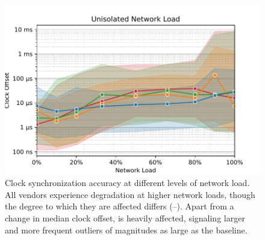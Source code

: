 \begin{figure}
    \centering
    \includegraphics[width=\linewidth]{res/generated/net_unprioritized_trend_rpi-4.pdf}
    \legend
    \caption{Clock synchronization accuracy at different levels of network load. All vendors experience degradation at higher network loads, though the degree to which they are affected differs (\fRatio{\cmpMin}--\fRatio{\cmpMax}). Apart from a change in median clock offset, \PNineFive{} is heavily affected, signaling larger and more frequent outliers of magnitudes \fRatio[-1]{\cmpMax} as large as the baseline.}
    \label{fig:network_load}
\end{figure}


